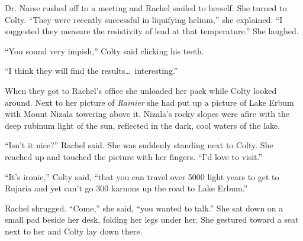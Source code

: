 Dr. Narse rushed off to a meeting and Rachel smiled to herself. She turned to Colty. ``They
were recently successful in liquifying helium,'' she explained. ``I suggested they measure the
resistivity of lead at that temperature.'' She laughed.

``You sound very impish,'' Colty said clicking his teeth.

``I think they will find the results\ldots\ interesting.''

When they got to Rachel's office she unloaded her pack while Colty looked around. Next to her
picture of \textit{Rainier} she had put up a picture of Lake Erbum with Mount Nizala towering
above it. Nizala's rocky slopes were afire with the deep rubinum light of the sun, reflected in
the dark, cool waters of the lake.

``Isn't it nice?'' Rachel said. She was suddenly standing next to Colty. She reached up and
touched the picture with her fingers. ``I'd love to visit.''

``It's ironic,'' Colty said, ``that you can travel over 5000 light years to get to Rujaria and
yet can't go 300 karnons up the road to Lake Erbum.''

Rachel shrugged. ``Come,'' she said, ``you wanted to talk.'' She sat down on a small pad beside
her desk, folding her legs under her. She gestured toward a seat next to her and Colty lay down
there.

